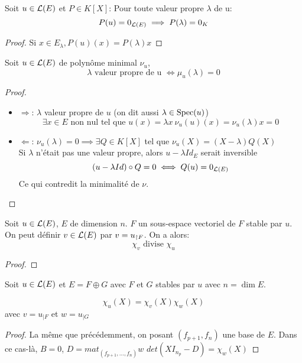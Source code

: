 \begin{prop}
	Soit $u \in \mathcal{L}(E)$ et $P \in K[X]$: Pour toute valeur propre $\lambda$ de u:
	$$ P(u) = 0_{\mathcal{L}(E)} \implies P(\lambda) = 0_K$$
\end{prop}

\begin{proof}
	Si $x \in E_\lambda , P(u)(x) = P(\lambda) x$ %
\end{proof}


\begin{prop}
	Soit $u \in \mathcal{L}(E)$ de polynôme minimal $\nu_u$,
	$$ \lambda \text{ valeur propre de u }\iff \mu_u(\lambda) = 0$$
\end{prop}


\begin{proof}
	\begin{itemize}
		\item  $\Rightarrow$:
		      $\lambda$ valeur propre de $u$ (on dit aussi $\lambda \in \text{Spec}(u)$)
		      $$\exists x \in E \text { non nul tel que } u(x) = \lambda x \ \nu_u(u)(x) = \nu_u(\lambda)x =0$$
		\item $\Leftarrow$:
		      $\nu_u(\lambda) = 0 \implies \exists Q \in K[X]$ tel que $\nu_u(X) = (X - \lambda)Q(X)$\\
		      Si $\lambda$ n'était pas une valeur propre, alors $u-\lambda Id_E$ serait inversible
		      $$ (u-  \lambda Id) \circ Q = 0 \iff Q(u) = 0_{\mathcal{L}(E)}$$
		      Ce qui contredit la minimalité de $\nu$.
	\end{itemize}
\end{proof}



\begin{prop}
	Soit $u \in \mathcal{L}(E)$, $E$ de dimension $n$.
	$F$ un sous-espace vectoriel de $F$ stable par $u$.
	On peut définir $v \in \mathcal{L}(E)$ par $v = u_{\restriction F}$. On a alors:
	$$\chi_v \text{ divise } \chi_u$$
\end{prop}

\begin{proof}
\end{proof}

\begin{prop}
	Soit $u \in \mathcal{L}(E)$ et $E = F \oplus G$ avec $F$ et $G$ stables par $u$ avec $n = \dim E$.

	$$\chi_u (X)= \chi_v (X) \chi_w(X)$$
	avec $v = u_{|F}$ et $w = u_{|G}$
\end{prop}

\begin{proof}
	La même que précédemment, on posant $(f_{p+1}, f_n)$ une base de $E$.
	Dans ce cas-là, $B = 0$, $D = mat_{(f_{p+1}, \dots, f_n)} w$
	$det(XI_{n_p} - D) = \chi_w(X)$
\end{proof}

